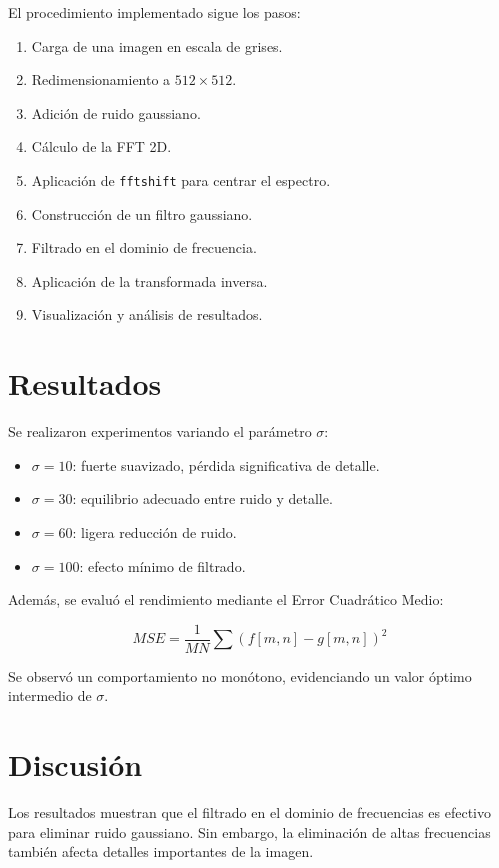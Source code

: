\documentclass[conference]{IEEEtran}
\begin{document}
	El procedimiento implementado sigue los pasos:
	
	\begin{enumerate}
		\item Carga de una imagen en escala de grises.
		\item Redimensionamiento a $512 \times 512$.
		\item Adición de ruido gaussiano.
		\item Cálculo de la FFT 2D.
		\item Aplicación de \texttt{fftshift} para centrar el espectro.
		\item Construcción de un filtro gaussiano.
		\item Filtrado en el dominio de frecuencia.
		\item Aplicación de la transformada inversa.
		\item Visualización y análisis de resultados.
	\end{enumerate}
	
	\section{Resultados}
	
	Se realizaron experimentos variando el parámetro $\sigma$:
	
	\begin{itemize}
		\item $\sigma = 10$: fuerte suavizado, pérdida significativa de detalle.
		\item $\sigma = 30$: equilibrio adecuado entre ruido y detalle.
		\item $\sigma = 60$: ligera reducción de ruido.
		\item $\sigma = 100$: efecto mínimo de filtrado.
	\end{itemize}
	
	Además, se evaluó el rendimiento mediante el Error Cuadrático Medio:
	
	\begin{equation}
		MSE = \frac{1}{MN} \sum (f[m,n] - g[m,n])^2
	\end{equation}
	
	Se observó un comportamiento no monótono, evidenciando un valor óptimo intermedio de $\sigma$.
	
	\section{Discusión}
	
	Los resultados muestran que el filtrado en el dominio de frecuencias es efectivo para eliminar ruido gaussiano. Sin embargo, la eliminación de altas frecuencias también afecta detalles importantes de la imagen.
	
\end{document}
